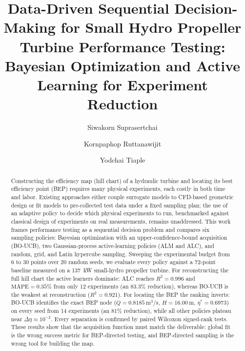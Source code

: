 \documentclass[preprint,12pt]{elsarticle}
\begin{document}
\begin{frontmatter}

\title{Data-Driven Sequential Decision-Making for Small Hydro Propeller Turbine
Performance Testing: Bayesian Optimization and Active Learning for Experiment
Reduction}

\author[a]{Siwakorn Suprasertchai}
\author[b]{Kornpaphop Ruttanawijit}
\author[a]{Yodchai Tiaple}


\begin{abstract}
Constructing the efficiency map (hill chart) of a hydraulic turbine and locating
its best efficiency point (BEP) requires many physical experiments, each costly in
both time and labor. Existing approaches either couple surrogate models to
CFD-based geometric design or fit models to pre-collected test data under a fixed
sampling plan; the use of an adaptive policy to decide which physical experiments
to run, benchmarked against classical design of experiments on real measurements,
remains unaddressed. This work frames performance testing as a sequential decision
problem and compares six sampling policies: Bayesian optimization with an
upper-confidence-bound acquisition (BO-UCB), two Gaussian-process active-learning
policies (ALM and ALC), and random, grid, and Latin hypercube sampling. Sweeping
the experimental budget from 6 to 30 points over 20 random seeds, we evaluate every
policy against a 72-point baseline measured on a \SI{137}{\kilo\watt} small-hydro
propeller turbine. For reconstructing the full hill chart the active learners
dominate: ALC reaches $R^2 = 0.996$ and $\mathrm{MAPE} = 0.35\%$ from only 12
experiments (an 83.3\% reduction), whereas BO-UCB is the weakest at reconstruction
($R^2 = 0.921$). For locating the BEP the ranking inverts: BO-UCB identifies the
exact BEP node ($Q = \SI{0.8185}{\cubic\metre\per\second}$, $H = \SI{16.00}{\metre}$,
$\eta^\ast = 0.6973$) on every seed from 14 experiments (an 81\% reduction), while
all other policies plateau near $\Delta\eta \approx 10^{-2}$. Every separation is
confirmed by paired Wilcoxon signed-rank tests. These results show that the
acquisition function must match the deliverable: global fit is the wrong success
metric for BEP-directed testing, and BEP-directed sampling is the wrong tool for
building the map.
\end{abstract}


\end{frontmatter}
\end{document}
